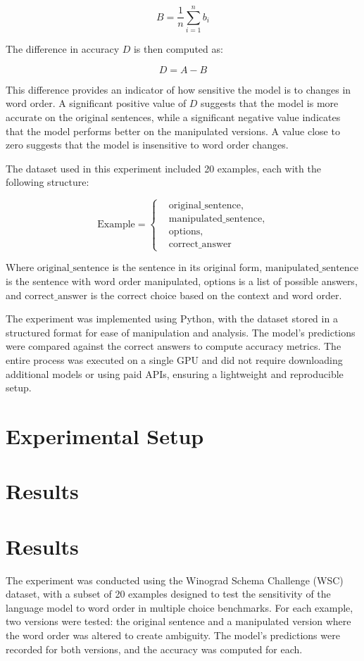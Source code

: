 \documentclass{article}
\begin{document}
$$
B = \frac{1}{n} \sum_{i=1}^{n} b_i
$$

The difference in accuracy $ D $ is then computed as:

$$
D = A - B
$$

This difference provides an indicator of how sensitive the model is to changes in word order. A significant positive value of $ D $ suggests that the model is more accurate on the original sentences, while a significant negative value indicates that the model performs better on the manipulated versions. A value close to zero suggests that the model is insensitive to word order changes.

The dataset used in this experiment included 20 examples, each with the following structure:

$$
\text{Example} = \left\{ 
\begin{aligned}
&\text{original\_sentence}, \\
&\text{manipulated\_sentence}, \\
&\text{options}, \\
&\text{correct\_answer}
\end{aligned} 
\right.
$$

Where $\text{original\_sentence}$ is the sentence in its original form, $\text{manipulated\_sentence}$ is the sentence with word order manipulated, $\text{options}$ is a list of possible answers, and $\text{correct\_answer}$ is the correct choice based on the context and word order.

The experiment was implemented using Python, with the dataset stored in a structured format for ease of manipulation and analysis. The model's predictions were compared against the correct answers to compute accuracy metrics. The entire process was executed on a single GPU and did not require downloading additional models or using paid APIs, ensuring a lightweight and reproducible setup.
\section{Experimental Setup}

\section{Results}
\section{Results}

The experiment was conducted using the Winograd Schema Challenge (WSC) dataset, with a subset of 20 examples designed to test the sensitivity of the language model to word order in multiple choice benchmarks. For each example, two versions were tested: the original sentence and a manipulated version where the word order was altered to create ambiguity. The model's predictions were recorded for both versions, and the accuracy was computed for each.
\end{document}
